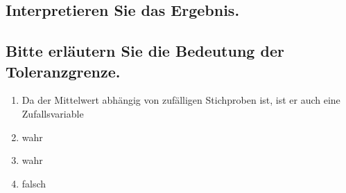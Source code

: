 \documentclass[12pt, a4paper, titlepage]{article}
\begin{document}
	
	\subsection{Interpretieren Sie das Ergebnis.}


	

	\subsection{Bitte erl\"autern Sie die Bedeutung der Toleranzgrenze.}
	\begin{enumerate}
		\item Da der Mittelwert abh\"angig von zuf\"alligen Stichproben ist, ist er auch eine Zufallsvariable
		\item wahr
		\item wahr
		\item falsch
	\end{enumerate}
	
\end{document}
